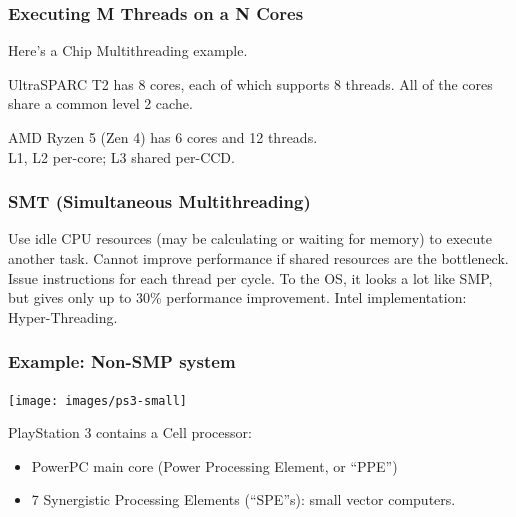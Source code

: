 \begin{frame}
  \frametitle{Executing M Threads on a N Cores}
\begin{center}
\end{center}

\begin{changemargin}{2.5cm}
Here's a Chip Multithreading example. \vfill

UltraSPARC T2 has 8 cores, each of which supports 8 
threads. All of the cores share a common level 2 cache. \vfill

AMD Ryzen 5 (Zen 4) has 6 cores and 12 threads. \\ L1, L2 per-core; L3 shared per-CCD.
\end{changemargin}

\end{frame}

\begin{frame}
  \frametitle{SMT (Simultaneous Multithreading)}


    Use idle CPU resources (may be calculating or waiting
          for memory) to execute another task.
    \vfill
    Cannot improve performance if shared resources are the bottleneck.
    \vfill
    Issue instructions for each thread per cycle.
    \vfill
    To the OS, it looks a lot like SMP, but gives only up to 30\% performance improvement.
    \vfill
Intel implementation: Hyper-Threading.

\end{frame}

\begin{frame}
  \frametitle{Example: Non-SMP system}

\begin{center}
  \texttt{[image: images/ps3-small]}
\end{center}

  PlayStation 3 contains a Cell processor:
  \begin{itemize}
    \item PowerPC main core (Power Processing Element, or ``PPE'')
    \item 7 Synergistic Processing Elements (``SPE''s): small vector computers.
  \end{itemize}
\end{frame}


